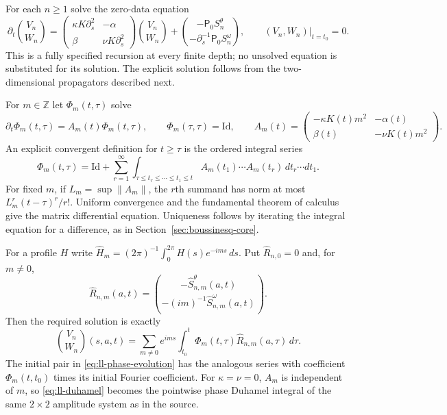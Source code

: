 For each $n\geq1$ solve the zero-data equation
\begin{equation}
\partial_t\binom{V_n}{W_n}
=\begin{pmatrix}\kappa K\partial_s^2&-\alpha\\
                   \beta&\nu K\partial_s^2\end{pmatrix}
 \binom{V_n}{W_n}
 +\binom{-\mathsf P_0S_n^\theta}
              {-\partial_s^{-1}\mathsf P_0S_n^\omega},
\qquad (V_n,W_n)|_{t=t_0}=0.
\label{eq:ll-correction-evolution}
\end{equation}
This is a fully specified recursion at every finite depth; no
unsolved equation is substituted for its solution. The explicit
solution follows from the two-dimensional propagators described next.

For $m\in\mathbb Z$ let $\Phi_m(t,\tau)$ solve
\[
\partial_t\Phi_m(t,\tau)=A_m(t)\Phi_m(t,\tau),\qquad
\Phi_m(\tau,\tau)=\mathrm{Id},\qquad
A_m(t)=\begin{pmatrix}-\kappa K(t)m^2&-\alpha(t)\\
                           \beta(t)&-\nu K(t)m^2\end{pmatrix}.
\]
An explicit convergent definition for $t\geq\tau$ is the ordered
integral series
\begin{equation}
\Phi_m(t,\tau)=\mathrm{Id}
 +\sum_{r=1}^\infty
 \int_{\tau\leq t_r\leq\cdots\leq t_1\leq t}
 A_m(t_1)\cdots A_m(t_r)\,dt_r\cdots dt_1.
\label{eq:ll-propagator-series}
\end{equation}
For fixed $m$, if $L_m=\sup\|A_m\|$, the $r$th summand has norm
at most $L_m^r(t-\tau)^r/r!$. Uniform convergence and the fundamental
theorem of calculus give the matrix differential equation.
Uniqueness follows by iterating the integral equation for a difference,
as in Section~\ref{sec:boussinesq-core}.

For a profile $H$ write
$\widehat H_m=(2\pi)^{-1}\int_0^{2\pi}H(s)e^{-ims}\,ds$.
Put $\widehat R_{n,0}=0$ and, for $m\ne0$,
\[
\widehat R_{n,m}(a,t)=
\binom{-\widehat S_{n,m}^\theta(a,t)}
      {-(im)^{-1}\widehat S_{n,m}^\omega(a,t)}.
\]
Then the required solution is exactly
\begin{equation}
\binom{V_n}{W_n}(s,a,t)
=\sum_{m\ne0}e^{ims}
 \int_{t_0}^t\Phi_m(t,\tau)\widehat R_{n,m}(a,\tau)\,d\tau.
\label{eq:ll-duhamel}
\end{equation}
The initial pair in \eqref{eq:ll-phase-evolution} has the analogous
series with coefficient $\Phi_m(t,t_0)$ times its initial Fourier
coefficient. For $\kappa=\nu=0$, $A_m$ is independent of $m$, so
\eqref{eq:ll-duhamel} becomes the pointwise phase Duhamel integral
of the same $2\times2$ amplitude system as in the source.

